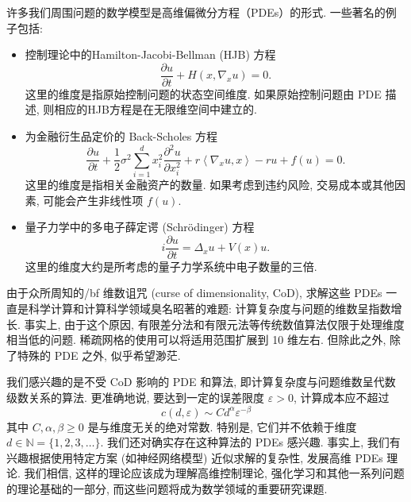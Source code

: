 \documentclass[12pt,AutoFakeBold,AutoFakeSlant]{article}
\newcommand{\bi}{\begin{itemize}}
\newcommand{\ei}{\end{itemize}}
\theoremstyle{definition}
\newcommand{\N}{\mathbb{N}}
\newcommand{\bx}{{x}}
\newcommand{\eps}{\varepsilon}
\begin{document}
	许多我们周围问题的数学模型是高维偏微分方程（PDEs）的形式. 一些著名的例子包括:
	\bi
		\item
			控制理论中的Hamilton-Jacobi-Bellman (HJB) 方程
			\begin{equation}
				\frac{ \partial u }{ \partial t } + H( \bx, \nabla_x u ) = 0 .
			\end{equation}
			这里的维度是指原始控制问题的状态空间维度. 如果原始控制问题由 PDE 描述, 则相应的HJB方程是在无限维空间中建立的.
		\item
			为金融衍生品定价的 Back-Scholes 方程
			\begin{equation}
				\frac{ \partial u }{ \partial t } + \frac12\sigma^2 \sum_{i=1}^d x_i^2\frac{\partial^2 u}{\partial x_i^2} + r \left< \nabla_x u , \bx \right> - r u + f(u) = 0 .
			\end{equation}
				这里的维度是指相关金融资产的数量. 如果考虑到违约风险, 交易成本或其他因素, 可能会产生非线性项 $f(u)$.
		\item
			量子力学中的多电子薛定谔 (Schr\"odinger) 方程
			\begin{equation}
				i \frac{ \partial u }{ \partial t } =   \Delta_x u + V(\bx) u .
			\end{equation}
			这里的维度大约是所考虑的量子力学系统中电子数量的三倍.
	\ei

	由于众所周知的{/bf 维数诅咒 (curse of dimensionality, CoD)}, 求解这些 PDEs 一直是科学计算和计算科学领域臭名昭著的难题: 计算复杂度与问题的维数呈指数增长. 事实上, 由于这个原因, 有限差分法和有限元法等传统数值算法仅限于处理维度相当低的问题. 稀疏网格的使用可以将适用范围扩展到 10 维左右. 但除此之外, 除了特殊的 PDE 之外, 似乎希望渺茫.

	我们感兴趣的是不受 CoD 影响的 PDE 和算法, 即计算复杂度与问题维数呈代数级数关系的算法. 更准确地说, 要达到一定的误差限度 $ \eps > 0 $, 计算成本应不超过
	\begin{equation}
		c(d, \eps) \sim C d^{\alpha} \eps^{-\beta}
		\label{cost}
	\end{equation}
	其中 $ C, \alpha, \beta \geq 0 $ 是与维度无关的绝对常数. 特别是, 它们并不依赖于维度 $ d \in \N = \{ 1, 2, 3, \dots \} $. 我们还对确实存在这种算法的 PDEs 感兴趣. 事实上, 我们有兴趣根据使用特定方案 (如神经网络模型) 近似求解的复杂性, 发展高维 PDEs 理论. 我们相信, 这样的理论应该成为理解高维控制理论, 强化学习和其他一系列问题的理论基础的一部分, 而这些问题将成为数学领域的重要研究课题.
	
\end{document}
